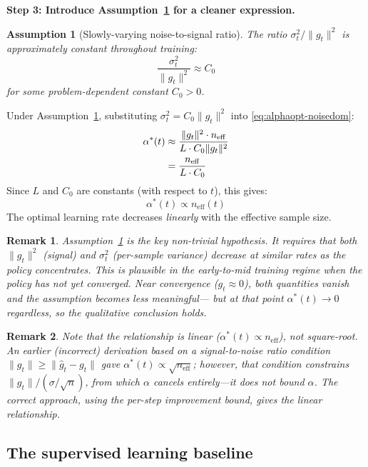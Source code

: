 \documentclass[11pt,a4paper]{article}
\newcommand{\neff}{n_{\mathrm{eff}}}
\newcommand{\ghat}{\hat{g}_t}
\newcommand{\gtrue}{g_t}
\newcommand{\alphaopt}{\alpha^*(t)}
\newtheorem{remark}{Remark}
\newtheorem{assumption}{Assumption}
\begin{document}
\textbf{Step 3: Introduce Assumption~\ref{ass:nsr} for a cleaner expression.}

\begin{assumption}[Slowly-varying noise-to-signal ratio]
  \label{ass:nsr}
  The ratio $\sigma_t^2 / \|\gtrue\|^2$ is approximately constant throughout training:
  \[
    \frac{\sigma_t^2}{\|\gtrue\|^2} \approx C_0
  \]
  for some problem-dependent constant $C_0 > 0$.
\end{assumption}

Under Assumption~\ref{ass:nsr}, substituting $\sigma_t^2 = C_0 \|\gtrue\|^2$ into \eqref{eq:alphaopt-noisedom}:
\begin{align}
  \alphaopt
  &\approx \frac{\|\gtrue\|^2 \cdot \neff}{L \cdot C_0 \|\gtrue\|^2} \notag\\
  &= \frac{\neff}{L \cdot C_0}
  \label{eq:alphaopt-linear}
\end{align}
Since $L$ and $C_0$ are constants (with respect to $t$), this gives:
\begin{equation}
  \boxed{\alphaopt \propto \neff(t)}
  \label{eq:alphaopt-prop}
\end{equation}
The optimal learning rate decreases \emph{linearly} with the effective sample size.

\begin{remark}
  Assumption~\ref{ass:nsr} is the key non-trivial hypothesis.
  It requires that both $\|\gtrue\|^2$ (signal) and $\sigma_t^2$ (per-sample variance) decrease
  at similar rates as the policy concentrates.
  This is plausible in the early-to-mid training regime when the policy has not yet converged.
  Near convergence ($\gtrue \approx 0$), both quantities vanish and the assumption becomes less meaningful---
  but at that point $\alphaopt \to 0$ regardless, so the qualitative conclusion holds.
\end{remark}

\begin{remark}
  Note that the relationship is \emph{linear} ($\alphaopt \propto \neff$), not square-root.
  An earlier (incorrect) derivation based on a signal-to-noise ratio condition
  $\|\gtrue\| \geq \|\ghat - \gtrue\|$ gave $\alphaopt \propto \sqrt{\neff}$;
  however, that condition constrains $\|\gtrue\| / (\sigma/\sqrt{n})$, from which $\alpha$
  cancels entirely---it does not bound $\alpha$.
  The correct approach, using the per-step improvement bound, gives the linear relationship.
\end{remark}

\subsection{The supervised learning baseline}
\end{document}
